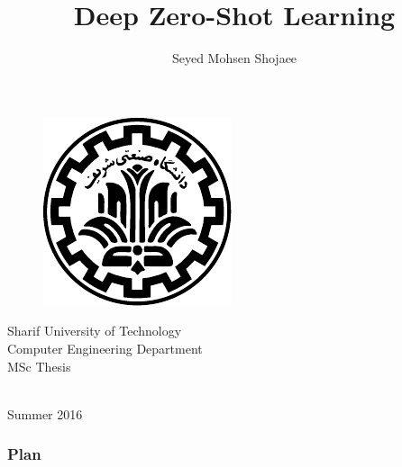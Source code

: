 \documentclass{beamer}
\begin{document}
\title{Deep Zero-Shot Learning}
\author{Seyed Mohsen Shojaee}
\date{}

\begin{frame}
  \begin{center}
\begin{figure}
\includegraphics[scale=0.5]{../images/logo.pdf}
\end{figure}
{\footnotesize Sharif University of Technology \\ Computer Engineering Department \\ MSc Thesis}
\maketitle
\vspace{-10mm}{\footnotesize supervised by \\ Dr.Mahdieh Soleymani} \\
\vspace{4mm}
Summer 2016
\end{center}
\end{frame}



\begin{frame}
  \frametitle{Plan}
  \tableofcontents
\end{frame}
\end{document}
